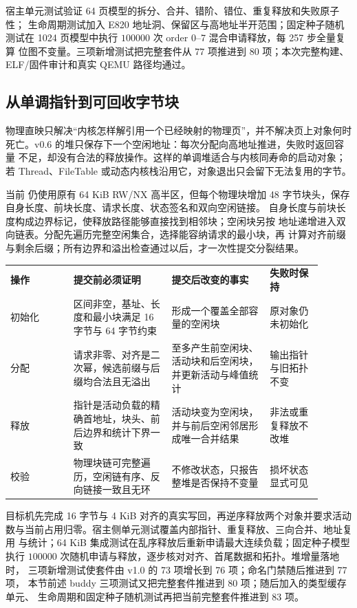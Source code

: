 宿主单元测试验证 64 页模型的拆分、合并、错阶、错位、重复释放和失败原子性；
生命周期测试加入 E820 地址洞、保留区与高地址半开范围；固定种子随机测试在
1024 页模型中执行 \(100000\) 次 order 0--7 混合申请释放，每 257 步全量复算
位图不变量。三项新增测试把完整套件从 \(77\) 项推进到 \(80\) 项；本次完整构建、
ELF/固件审计和真实 QEMU 路径均通过。

\subsection{从单调指针到可回收字节块}

物理直映只解决“内核怎样解引用一个已经映射的物理页”，并不解决页上对象何时
死亡。v0.6 的堆只保存下一个空闲地址：每次分配向高地址推进，失败时返回容量
不足，却没有合法的释放操作。这样的单调堆适合与内核同寿命的启动对象；若
Thread、FileTable 或动态内核栈沿用它，对象退出只会留下无法复用的字节。

当前  仍使用原有 64 KiB RW/NX 高半区，但每个物理块增加
48 字节块头，保存自身长度、前块长度、请求长度、状态签名和双向空闲链接。
自身长度与前块长度构成边界标记，使释放路径能够直接找到相邻块；空闲块另按
地址递增进入双向链表。分配先遍历完整空闲集合，选择能容纳请求的最小块，再
计算对齐前缀与剩余后缀；所有边界和溢出检查通过以后，才一次性提交分裂结果。

\begin{longtable}{|L{0.18\linewidth}|L{0.28\linewidth}|L{0.29\linewidth}|L{0.15\linewidth}|}
\hline
{}
\textbf{操作} & \textbf{提交前必须证明} & \textbf{提交后改变的事实} &
\textbf{失败时保持} \\\tablerowrule
\endhead
初始化 & 区间非空，基址、长度和最小块满足 16 字节与 64 字节约束 &
形成一个覆盖全部容量的空闲块 & 原对象仍未初始化 \\\tablerowrule
分配 & 请求非零、对齐是二次幂，候选前缀与后缀均合法且无溢出 &
至多产生前空闲块、活动块和后空闲块，并更新活动与峰值统计 &
输出指针与旧拓扑不变 \\\tablerowrule
释放 & 指针是活动负载的精确首地址，块头、前后边界和统计下界一致 &
活动块变为空闲块，并与前后空闲邻居形成唯一合并结果 &
非法或重复释放不改堆 \\\tablerowrule
校验 & 物理块链可完整遍历，空闲链有序、反向链接一致且无环 &
不修改状态，只报告整堆是否保持不变量 &
损坏状态显式可见 \\\hline
\end{longtable}

目标机先完成 16 字节与 4 KiB 对齐的真实写回，再逆序释放两个对象并要求活动
数与当前占用归零。宿主侧单元测试覆盖内部指针、重复释放、三向合并、地址复用
与统计；64 KiB 集成测试在乱序释放后重新申请最大连续负载；固定种子模型执行
\(100000\) 次随机申请与释放，逐步核对对齐、首尾数据和拓扑。堆增量落地时，
三项新增测试使套件由 v1.0 的 73 项增长到 76 项；命名门禁随后推进到 77 项，
本节前述 buddy 三项测试又把完整套件推进到 80 项；随后加入的类型缓存单元、
生命周期和固定种子随机测试再把当前完整套件推进到 83 项。

